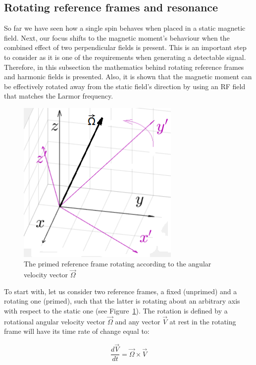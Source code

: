 \subsection{Rotating reference frames and resonance}
So far we have seen how a single spin behaves when placed in a static magnetic field. Next, our focus shifts to the magnetic moment's behaviour when the combined effect of two perpendicular fields is present. This is an important step to consider as it is one of the requirements when generating a detectable signal. Therefore, in this subsection the mathematics behind rotating reference frames and harmonic fields is presented. Also, it is shown that the magnetic moment can be effectively rotated away from the static field's direction by using an RF field that matches the Larmor frequency.

\begin{figure}[ht]
    \centering
    \includegraphics[width=0.7\textwidth,keepaspectratio]{primedframe}
    \caption{The primed reference frame rotating according to the angular velocity vector $\vec{\Omega}$}
    \label{fig:22}
\end{figure}

To start with, let us consider two reference frames, a fixed (unprimed) and a rotating one (primed), such that the latter is rotating about an arbitrary axis with respect to the static one (see Figure~\ref{fig:22}). The rotation is defined by a rotational angular velocity vector $\vec{\Omega}$ and any vector $\vec{V}$ at rest in the rotating frame will have its time rate of change equal to:

\begin{equation}
    \frac{d\vec{V}}{dt} = \vec{\Omega} \times \vec{V}    
\end{equation}

